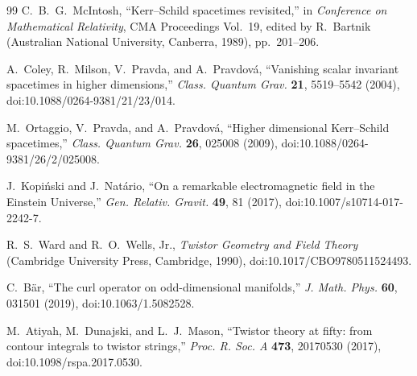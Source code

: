 \documentclass[aps,prd,reprint,nofootinbib,superscriptaddress]{revtex4-2}
\theoremstyle{definition}
\theoremstyle{remark}
\begin{document}
\begin{thebibliography}{99}
C.~B.~G.~McIntosh,
``Kerr--Schild spacetimes revisited,''
in \emph{Conference on Mathematical Relativity},
CMA Proceedings Vol.~19, edited by R.~Bartnik
(Australian National University, Canberra, 1989), pp.~201--206.

A.~Coley, R.~Milson, V.~Pravda, and A.~Pravdov\'a,
``Vanishing scalar invariant spacetimes in higher dimensions,''
\emph{Class. Quantum Grav.} \textbf{21}, 5519--5542 (2004),
doi:10.1088/0264-9381/21/23/014.

M.~Ortaggio, V.~Pravda, and A.~Pravdov\'a,
``Higher dimensional Kerr--Schild spacetimes,''
\emph{Class. Quantum Grav.} \textbf{26}, 025008 (2009),
doi:10.1088/0264-9381/26/2/025008.


J.~Kopi\'{n}ski and J.~Nat\'{a}rio,
``On a remarkable electromagnetic field in the Einstein Universe,''
\emph{Gen. Relativ. Gravit.} \textbf{49}, 81 (2017),
doi:10.1007/s10714-017-2242-7.

R.~S.~Ward and R.~O.~Wells, Jr.,
\emph{Twistor Geometry and Field Theory}
(Cambridge University Press, Cambridge, 1990),
doi:10.1017/CBO9780511524493.

C.~B\"ar,
``The curl operator on odd-dimensional manifolds,''
\emph{J. Math. Phys.} \textbf{60}, 031501 (2019),
doi:10.1063/1.5082528.

M.~Atiyah, M.~Dunajski, and L.~J.~Mason,
``Twistor theory at fifty: from contour integrals to twistor strings,''
\emph{Proc. R. Soc. A} \textbf{473}, 20170530 (2017),
doi:10.1098/rspa.2017.0530.

\end{thebibliography}
\end{document}
